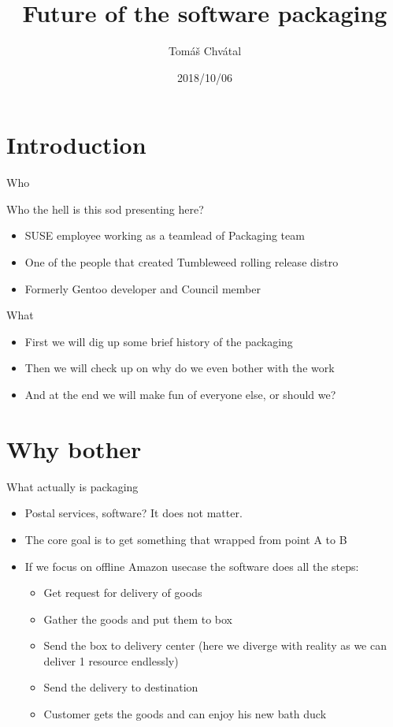 \documentclass{beamer}
\author{Tom\'{a}\v{s} Chv\'{a}tal\newline {\small tchvatal@suse.com}\newline {\small SUSE/L3 - Packaging}}
\title{Future of the software packaging}
\date{2018/10/06}
\begin{document}
\begin{frame}[t,plain]
\titlepage
\end{frame}

\section{Introduction}

\begin{frame}[t]{Who}
    \begin{center}Who the hell is this sod presenting here?\end{center}
	\begin{itemize}
	\item SUSE employee working as a teamlead of Packaging team
    \item One of the people that created Tumbleweed rolling release distro
    \item Formerly Gentoo developer and Council member
	\end{itemize}
\end{frame}

\begin{frame}[t]{What}
	\begin{itemize}
	\item First we will dig up some brief history of the packaging
    \item Then we will check up on why do we even bother with the work
    \item And at the end we will make fun of everyone else, or should we?
	\end{itemize}
\end{frame}

\section{Why bother}

\begin{frame}[t]{What actually is packaging}
	\begin{itemize}
	\item Postal services, software? It does not matter.
	\item The core goal is to get something that wrapped from point A to B
	\item If we focus on offline Amazon usecase the software does all the steps:
	\begin{itemize}
	\item Get request for delivery of goods
	\item Gather the goods and put them to box
	\item Send the box to delivery center (here we diverge with reality as we can deliver 1 resource endlessly)
	\item Send the delivery to destination
	\item Customer gets the goods and can enjoy his new bath duck
	\end{itemize}
	\end{itemize}
\end{frame}
\end{document}
